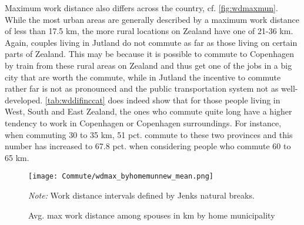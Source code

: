 Maximum work distance also differs across the country, cf. \autoref{fig:wdmaxmun}. While the most urban areas are generally described by a maximum work distance of less than 17.5 km, the more rural locations on Zealand have one of 21-36 km. Again, couples living in Jutland do not commute as far as those living on certain parts of Zealand. This may be because it is possible to commute to Copenhagen by train from these rural areas on Zealand and thus get one of the jobs in a big city that are worth the commute, while in Jutland the incentive to commute rather far is not as pronounced and the public transportation system not as well-developed. \autoref{tab:wddifinccat} does indeed show that for those people living in West, South and East Zealand, the ones who commute quite long have a higher tendency to work in Copenhagen or Copenhagen surroundings. For instance, when commuting 30 to 35 km, 51 pct. commute to these two provinces and this number has increased to 67.8 pct. when considering people who commute 60 to 65 km.
\begin{figure}[!htb]
\centering
\begin{minipage}{0.8\textwidth}
\texttt{[image: Commute/wdmax\_byhomemunnew\_mean.png]} 
{\tiny \emph{Note:} Work distance intervals defined by Jenks natural breaks. \par}
\end{minipage}
\caption{Avg. max work distance among spouses in km by home municipality}
\label{fig:wdmaxmun}
\end{figure}
\begin{table}[!htb]
\caption{Distribution of work provinces for individuals living in West, South and East Zealand by distance commuted ( avg. over 2000-2008)}
\label{tab:wddifinccat}
\end{table}
